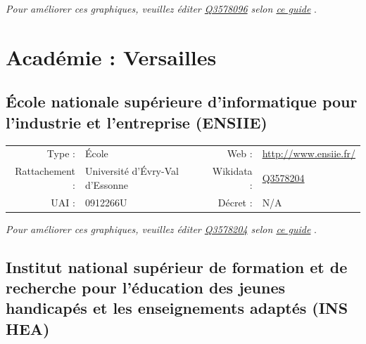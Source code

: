 \documentclass[11pt,french,landscape]{article}
\begin{document}
\textit{\scriptsize Pour améliorer ces graphiques, veuillez éditer \href{https://www.wikidata.org/entity/Q3578096}{Q3578096}  selon \href{https://github.com/cpesr/wikidataESR/blob/master/Rmd/wikidataESR.md}{ce guide}}
.


\newpage

\hypertarget{acaduxe9mie-versailles-1}{%
\section{Académie : Versailles}\label{acaduxe9mie-versailles-1}}

\hypertarget{uxe9cole-nationale-supuxe9rieure-dinformatique-pour-lindustrie-et-lentreprise-ensiie}{%
\subsection{École nationale supérieure d'informatique pour l'industrie
et l'entreprise
(ENSIIE)}\label{uxe9cole-nationale-supuxe9rieure-dinformatique-pour-lindustrie-et-lentreprise-ensiie}}

\begin{tabular*}{0.45\textwidth}{rp{2cm}rl}  
\hline  
Type : & École & Web : &\href{http://www.ensiie.fr/}{http://www.ensiie.fr/} \\  
Rattachement : & Université d'Évry-Val d'Essonne & Wikidata : & \href{https://www.wikidata.org/entity/Q3578204}{Q3578204} \\  
UAI : & 0912266U & Décret : & N/A \\  
\hline  
\end{tabular*}

\textit{\scriptsize Pour améliorer ces graphiques, veuillez éditer \href{https://www.wikidata.org/entity/Q3578204}{Q3578204}  selon \href{https://github.com/cpesr/wikidataESR/blob/master/Rmd/wikidataESR.md}{ce guide}}
.


\newpage

\hypertarget{institut-national-supuxe9rieur-de-formation-et-de-recherche-pour-luxe9ducation-des-jeunes-handicapuxe9s-et-les-enseignements-adaptuxe9s-ins-hea}{%
\subsection{Institut national supérieur de formation et de recherche
pour l'éducation des jeunes handicapés et les enseignements adaptés (INS
HEA)}\label{institut-national-supuxe9rieur-de-formation-et-de-recherche-pour-luxe9ducation-des-jeunes-handicapuxe9s-et-les-enseignements-adaptuxe9s-ins-hea}}
\end{document}
